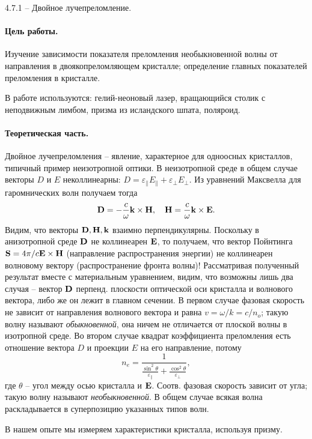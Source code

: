 \documentclass{../lab_class}
\begin{document}
{\Large 4.7.1 -- Двойное лучепреломление.}

\paragraph{Цель работы.}
Изучение  зависимости  показателя  преломления необыкновенной волны от направления в двоякопреломляющем кристалле; определение главных показателей преломления в кристалле.

В работе используются: гелий-неоновый лазер, вращающийся столик с неподвижным лимбом, призма из исландского шпата, поляроид.

\paragraph{Теоретическая часть.}
Двойное лучепреломления -- явление, характерное для одноосных кристаллов, типичный пример неизотропной оптики. В неизотропной среде в общем случае векторы $D$ и $E$ неколлинеарны: $D = \varepsilon_{\parallel} E_{\parallel} + \varepsilon_{\perp} E_{\perp}$. Из уравнений Максвелла для гаромнических волн получаем тогда
$$
	\vb{D} = -\frac{c}{\omega} \vb{k} \times \vb{H}, \quad \vb{H} = \frac{c}{\omega} \vb{k} \times \vb{E}.
$$
Видим, что векторы $\vb{D}, \vb{H}, \vb{k}$ взаимно перпендикулярны. Поскольку в анизотропной среде $\vb{D}$ не коллинеарен $\vb{E}$, то получаем, что вектор Пойнтинга $\vb{S} = 4\pi/c \vb{E} \times \vb{H}$ (направление распространения энергии) не коллинеарен волновому вектору (распространение фронта волны)! Рассматривая полученный результат вместе с материальным уравнением, видим, что возможны лишь два случая -- вектор $\vb{D}$ перпенд. плоскости оптической оси кристалла и волнового вектора, либо же он лежит в главном сечении. В первом случае фазовая скорость не зависит от направления волнового вектора и равна $v = \omega / k = c / n_o$; такую волну называют \emph{обыкновенной}, она ничем не отличается от плоской волны в изотропной среде. Во втором случае квадрат коэффициента преломления есть отношение вектора $D$ и проекции $E$ на его направление, потому
$$
	n_e = \frac{1}{\frac{\sin^2 \theta}{\varepsilon_{\parallel}} + \frac{\cos^2 \theta}{\varepsilon_{\perp}}},
$$
где $\theta$ -- угол между осью кристалла и $\vb{E}$. Соотв. фазовая скорость зависит от угла; такую волну называют \emph{необыкновенной}. В общем случае всякая волна раскладывается в суперпозицию указанных типов волн.

В нашем опыте мы измеряем характеристики кристалла, используя призму. 
\end{document}
